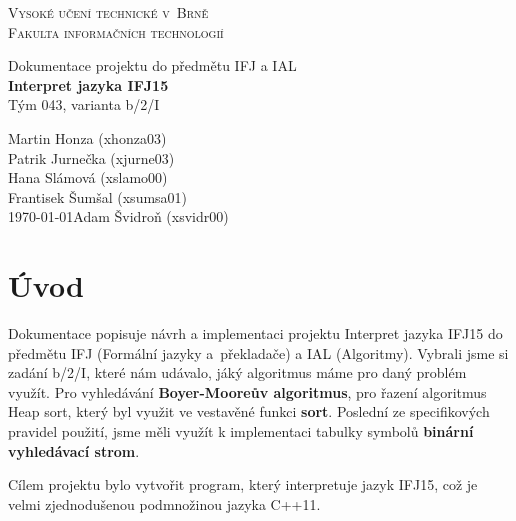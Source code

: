\documentclass[a4paper, 11pt, titlepage]{article}
\begin{document}

\begin{titlepage} %
\begin{center}
\textsc{\Huge{Vysoké učení technické v~Brně}\\[3mm]\huge{Fakulta informačních technologií}}\\


\begin{figure}[h]
	\centering
\end{figure}

\huge{Dokumentace projektu do předmětu IFJ a IAL}\\
\Huge{\textbf{Interpret jazyka IFJ15}}\\
\LARGE{Tým 043, varianta b/2/I}
\end{center}

{\noindent\Large \hfill Martin Honza (xhonza03)\\}
{\indent\Large \hfill Patrik Jurnečka (xjurne03)\\}
{\indent\Large \hfill Hana Slámová (xslamo00)\\}
{\indent\Large \hfill Frantisek Šumšal (xsumsa01)\\}
{\indent\Large\today \hfill Adam Švidroň (xsvidr00)}

\end{titlepage}

\tableofcontents

\newpage

\section{Úvod} %
Dokumentace popisuje návrh a implementaci projektu Interpret jazyka IFJ15 do předmětu IFJ (Formální jazyky a~překladače) a IAL (Algoritmy). Vybrali jsme si zadání b/2/I, které nám udávalo, jáký algoritmus máme pro daný problém využít. Pro vyhledávání \textbf{Boyer-Mooreův algoritmus}, pro řazení algoritmus Heap sort, který byl využit ve vestavěné funkci \textbf{sort}. Poslední ze specifikových pravidel použití, jsme měli využít k implementaci tabulky symbolů \textbf{binární vyhledávací strom}. 

Cílem projektu bylo vytvořit program, který interpretuje jazyk IFJ15, což je velmi zjednodušenou podmnožinou jazyka C++11. 
\end{document}
